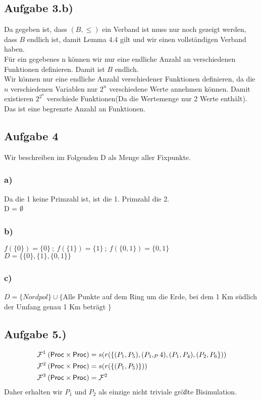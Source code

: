 \documentclass[10pt,a4paper,german,landscape,fleqn]{article} \usepackage[utf8]{inputenc} %
\begin{document}
\subsection*{Aufgabe 3.b)}
Da gegeben ist, dass $(B,\le)$ ein Verband ist muss nur noch gezeigt werden, dass
$B$ endlich ist, damit Lemma 4.4 gilt und wir einen vollständigen Verband haben. \\
Für ein gegebenes n können wir nur eine endliche Anzahl an verschiedenen Funktionen definieren. Damit ist $B$ endlich. \\
Wir können nur eine endliche Anzahl verschiedener Funktionen definieren, da die $n$ verschiedenen Variablen nur $2^n$ verschiedene Werte annehmen können. Damit existieren $2^{2^n}$ verschiede Funktionen(Da die Wertemenge nur 2 Werte enthält). Das ist eine begrenzte Anzahl an Funktionen.
\newpage


\subsection*{Aufgabe 4}
Wir beschreiben im Folgenden D als Menge aller Fixpunkte.
\subsubsection*{a)}
Da die 1 keine Primzahl ist, ist die 1. Primzahl die 2.\\
D = $\emptyset$
\subsubsection*{b)}
$f(\{0\})=\{0\} \ ; \ f(\{1\})=\{1\} \ ; \ f(\{0,1\})=\{0,1\}$\\
$D=\{ \{0\},\{1\},\{0,1\}\}$\\
\subsubsection*{c)}
$D=\{Nordpol\} \cup \{$Alle Punkte auf dem Ring um die Erde, bei dem 1 Km südlich der Umfang genau 1 Km beträgt $\} $\\
\subsection*{Aufgabe 5.)}
\begin{align}
&\mathbin{\mathcal{F}}^1(\mbox{\sf Proc} \times \mbox{\sf Proc}) = s(r(\{(P_1,P_5),(P_1,_P4),(P_1,P_4),(P_2,P_6\})) \\
&\mathbin{\mathcal{F}}^2(\mbox{\sf Proc} \times \mbox{\sf Proc}) = s(r(\{(P_1,P_5)\})) \\
&\mathbin{\mathcal{F}}^3(\mbox{\sf Proc} \times \mbox{\sf Proc}) = \mathbin{\mathcal{F}}^2 \\
\end{align}
Daher erhalten wir $P_1$ und $P_2$ als einzige nicht triviale größte Bisimulation.
\end{document}
